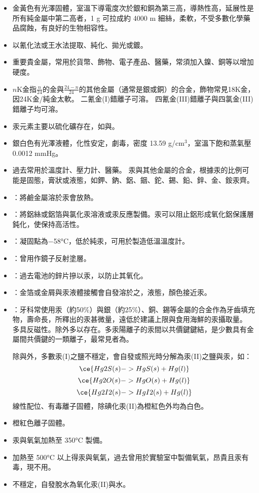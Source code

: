 \documentclass[a4paper,12pt]{report}
\begin{document}
\begin{itemize}
\begin{itemize}
\item 金黃色有光澤固體，室溫下導電度次於銀和銅為第三高，導熱性高，延展性是所有純金屬中第二高者，1 g 可拉成約 4000 m 細絲，柔軟，不受多數化學藥品腐蝕，有良好的生物相容性。
\item 以氰化法或王水法提取、純化、拋光或鍍。
\item 重要貴金屬，常用於貨幣、飾物、電子產品、醫藥，常須加入鎳、銅等以增加硬度。
\item $n$K金指$\frac{n}{24}$的金與$\frac{24-n}{24}$的其他金屬（通常是銀或銅）的合金，飾物常見18K金，因24K金/純金太軟。
\eit
{}
二氰金(I)錯離子\ce{[Au(CN)2]-}可溶。
四氰金(III)錯離子\ce{[Au(CN)4]-}與四氯金(III)錯離子\ce{[AuCl4]-}均可溶。
\bit
\item 汞元素主要以硫化礦存在，如與。
\item 銀白色有光澤液體，化性安定，劇毒，密度 13.59 g/cm$^3$，室溫下飽和蒸氣壓 0.0012 mmHg。
\item 過去常用於溫度計、壓力計、醫藥。
\eit
{}
汞與其他金屬的合金，根據汞的比例可能是固態，膏狀或液態，如鉀、鈉、鋁、銦、鉈、錫、鉛、鋅、金、銨汞齊。
\bit
\item {}：將鹼金屬溶於汞會放熱。
\item {}：將鋁絲或鋁箔與氯化汞溶液或汞反應製備。汞可以阻止鋁形成氧化鋁保護層鈍化，使保持高活性。
\item {}：凝固點為−58°C，低於純汞，可用於製造低溫溫度計。
\item {}：曾用作鏡子反射塗層。
\item {}：過去電池的鋅片摻以汞，以防止其氧化。
\item {}：金箔或金屑與汞液體接觸會自發溶於之，液態，顏色接近汞。
\item {}：牙科常使用汞（約50\%）與銀（約25\%）、銅、錫等金屬的合金作為牙齒填充物，壽命長，所釋出的汞甚微量，遠低於建議上限與食用海鮮的汞攝取量。
\eit
{}
多具反磁性。除外多以存在。多汞陽離子的汞間以共價鍵鍵結，是少數具有金屬間共價鍵的一類離子，最常見者為。

除與外，多數汞(I)之鹽不穩定，會自發或照光時分解為汞(II)之鹽與汞，如：
\[\ce{Hg2S(s) -> HgS(s) + Hg(l)}\]
\[\ce{Hg2O(s) -> HgO(s) + Hg(l)}\]
\[\ce{Hg2I2(s) -> HgI2(s) + Hg(l)}\]
線性配位、有毒離子固體，除碘化汞(II)為橙紅色外均為白色。
\bit
\item 橙紅色離子固體。
\item 汞與氧氣加熱至 350°C 製備。
\item 加熱至 500°C 以上得汞與氧氣，過去曾用於實驗室中製備氧氣，昂貴且汞有毒，現不用。
\item {}不穩定，自發脫水為氧化汞(II)與水。
\eit



\end{itemize}
\end{itemize}
\end{document}
